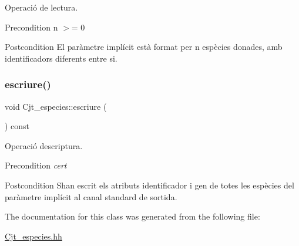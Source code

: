 Operació de lectura. 

\begin{DoxyPrecond}{Precondition}
n $>$= 0 
\end{DoxyPrecond}
\begin{DoxyPostcond}{Postcondition}
El paràmetre implícit està format per n espècies donades, amb identificadors diferents entre si. 
\end{DoxyPostcond}
\mbox{\label{class_cjt__especies_a07950c5f2b1c3e0384f246381ed7bd97}} 
\subsubsection{\texorpdfstring{escriure()}{escriure()}}
{\footnotesize\ttfamily void Cjt\+\_\+especies\+::escriure (\begin{DoxyParamCaption}{ }\end{DoxyParamCaption}) const}



Operació d\textquotesingle{}escriptura. 

\begin{DoxyPrecond}{Precondition}
{\itshape cert} 
\end{DoxyPrecond}
\begin{DoxyPostcond}{Postcondition}
S\textquotesingle{}han escrit els atributs identificador i gen de totes les espècies del paràmetre implícit al canal standard de sortida. 
\end{DoxyPostcond}


The documentation for this class was generated from the following file\+:\begin{DoxyCompactItemize}
\item 
\hyperlink{_cjt__especies_8hh}{Cjt\+\_\+especies.\+hh}\end{DoxyCompactItemize}
